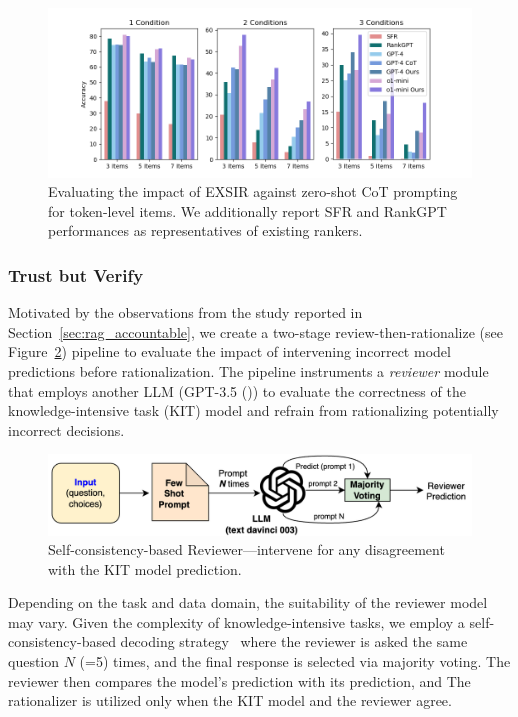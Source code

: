 \begin{figure}[th!]
    \centering
    \includegraphics[width=\linewidth]{submissions/Estevam2024/figures/new_token-bar.png}
    \vskip -1.8mm
    \caption{Evaluating the impact of EXSIR against zero-shot CoT prompting for token-level items. We additionally report SFR and RankGPT performances as representatives of existing rankers.}
    \label{fig:tok-bar}
\end{figure}

\subsubsection{Trust but Verify}
Motivated by the observations from the study reported in Section~\ref{sec:rag_accountable},
we create a two-stage review-then-rationalize (see Figure~\ref{fig:acc-rationalizer}) pipeline to evaluate the impact of intervening  
incorrect model predictions before rationalization. 
The pipeline instruments a \emph{reviewer} module
that employs another LLM (GPT-3.5  ()) to evaluate the correctness
of the knowledge-intensive task (KIT) model and refrain from
rationalizing potentially incorrect decisions. 
\begin{figure}[!htb]
    \centering
    \includegraphics[width=0.7\linewidth]{submissions/Estevam2024/figures/block-accountable.drawio.png}
    \caption{Self-consistency-based Reviewer---intervene for any disagreement with the KIT model prediction.}
    \label{fig:acc-rationalizer}
\end{figure}
 
Depending on the task and data domain, the suitability of the reviewer model may vary. Given the complexity of knowledge-intensive tasks, 
 we employ a self-consistency-based decoding strategy~\cite{wang2022self} where the reviewer is asked the same question $N$ (=5) times, and the final response is selected via majority voting. The reviewer then compares the model's prediction with its prediction, and The rationalizer is utilized only when the KIT model and the reviewer agree. 

